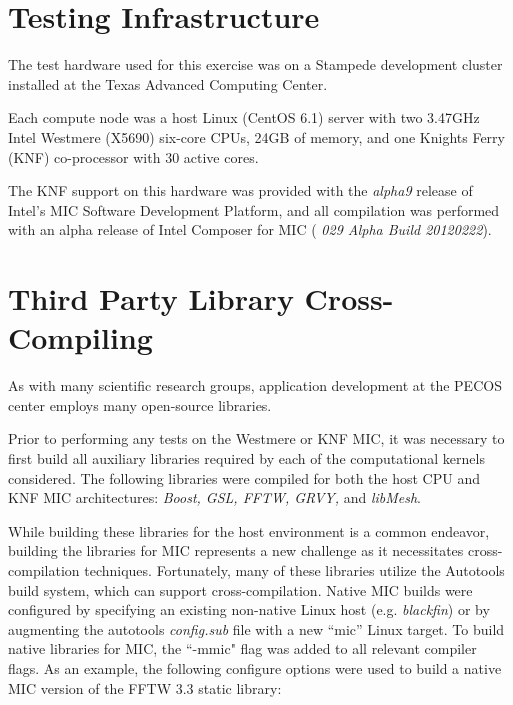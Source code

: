\section{Testing Infrastructure}
\label{sec:hardware}

The test hardware used for this exercise was
on a Stampede development cluster installed at the Texas Advanced
Computing Center.

Each compute node was a host Linux (CentOS 6.1)
server with two 3.47GHz Intel Westmere (X5690) six-core CPUs, 24GB of
memory, and one Knights Ferry (KNF) co-processor with 30 active
cores.

The KNF support on this hardware
was provided with the {\em alpha9} release of Intel's MIC Software
Development Platform, and all compilation was performed with an alpha
release of Intel Composer for MIC ({\em
  029 Alpha Build 20120222}).

\section{Third Party Library Cross-Compiling} \label{sec:cross_compile}

As with many scientific research groups, application development at
the PECOS center employs many open-source libraries.

Prior to
performing any tests on the Westmere or KNF MIC, it was necessary to
first build all auxiliary libraries required by each of the
computational kernels considered.
The following libraries were
compiled for both the host CPU and KNF MIC architectures: {\em Boost,
GSL, FFTW\cite{FFTW05}, GRVY,} and
{\em libMesh}.

While building these libraries for the host environment is
a common endeavor, building the libraries for MIC
represents a new challenge as it necessitates cross-compilation
techniques.
Fortunately, many of these libraries utilize the
Autotools build system, which can support cross-compilation.
Native MIC builds were configured by
specifying an existing non-native Linux host
(e.g. {\em blackfin}) or by augmenting the autotools {\em config.sub}
file with a new ``mic'' Linux target.
To build native libraries for MIC, the ``-mmic"
flag was added to all relevant compiler flags.
As an example, the following configure options were used to build a
native MIC version of the FFTW 3.3 static library:

